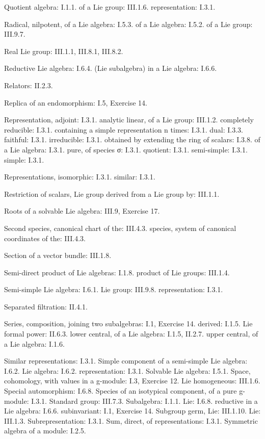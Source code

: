 Quotient algebra: I.1.1. of a Lie group: III.1.6. representation: I.3.1.

Radical, nilpotent, of a Lie algebra: I.5.3. of a Lie algebra: I.5.2. of a Lie group: III.9.7.

Real Lie group: III.1.1, III.8.1, III.8.2.

Reductive Lie algebra: I.6.4. (Lie subalgebra) in a Lie algebra: I.6.6.

Relators: II.2.3.

Replica of an endomorphism: I.5, Exercise 14.

Representation, adjoint: I.3.1. analytic linear, of a Lie group: III.1.2. completely reducible: I.3.1. containing a simple representation n times: I.3.1. dual: I.3.3. faithful: I.3.1. irreducible: I.3.1. obtained by extending the ring of scalars: I.3.8. of a Lie algebra: I.3.1. pure, of species σ: I.3.1. quotient: I.3.1. semi-simple: I.3.1. simple: I.3.1.

Representations, isomorphic: I.3.1. similar: I.3.1.

Restriction of scalars, Lie group derived from a Lie group by: III.1.1.

Roots of a solvable Lie algebra: III.9, Exercise 17.

Second species, canonical chart of the: III.4.3. species, system of canonical coordinates of the: III.4.3.

Section of a vector bundle: III.1.8.

Semi-direct product of Lie algebras: I.1.8. product of Lie groups: III.1.4.

Semi-simple Lie algebra: I.6.1. Lie group: III.9.8. representation: I.3.1.

Separated filtration: II.4.1.

Series, composition, joining two subalgebras: I.1, Exercise 14. derived: I.1.5. Lie formal power: II.6.3. lower central, of a Lie algebra: I.1.5, II.2.7. upper central, of a Lie algebra: I.1.6.

Similar representations: I.3.1. Simple component of a semi-simple Lie algebra: I.6.2. Lie algebra: I.6.2. representation: I.3.1. Solvable Lie algebra: I.5.1. Space, cohomology, with values in a g-module: I.3, Exercise 12. Lie homogeneous: III.1.6. Special automorphism: I.6.8. Species of an isotypical component, of a pure g-module: I.3.1. Standard group: III.7.3. Subalgebra: I.1.1. Lie: I.6.8. reductive in a Lie algebra: I.6.6. subinvariant: I.1, Exercise 14. Subgroup germ, Lie: III.1.10. Lie: III.1.3. Subrepresentation: I.3.1. Sum, direct, of representations: I.3.1. Symmetric algebra of a module: I.2.5.

